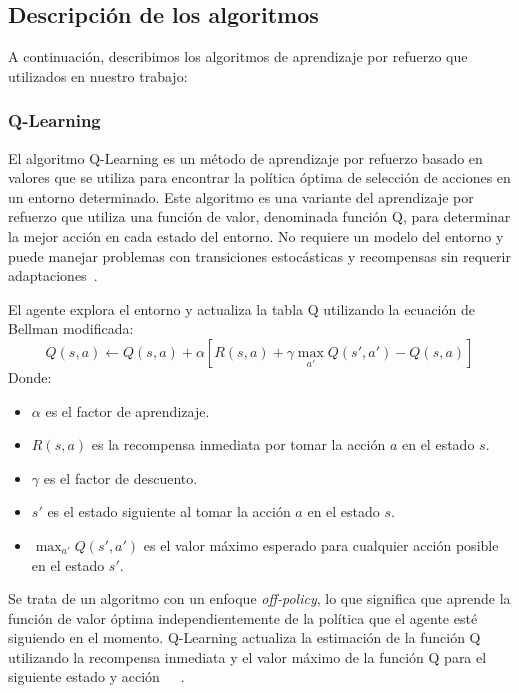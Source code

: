 \documentclass[conference,a4paper]{IEEEtran}
\begin{document}
\subsection{Descripción de los algoritmos}

A continuación, describimos los algoritmos de aprendizaje por refuerzo que utilizados en nuestro trabajo:\newline

\subsubsection{\textbf{Q-Learning}}
El algoritmo Q-Learning es un método de aprendizaje por refuerzo basado en valores que se utiliza para encontrar la política óptima de selección de acciones en un entorno determinado.
Este algoritmo es una variante del aprendizaje por refuerzo que utiliza una función de valor, denominada función Q, para determinar la mejor acción en cada estado del entorno.
No requiere un modelo del entorno y puede manejar problemas con transiciones estocásticas y recompensas sin requerir adaptaciones~\cite{b5}.

El agente explora el entorno y actualiza la tabla Q utilizando la ecuación de Bellman modificada:
\[
Q(s, a) \leftarrow Q(s, a) + \alpha [R(s, a) + \gamma \max_{a'} Q(s', a') - Q(s,a)]
\]
Donde:
\begin{itemize}
    \item \(\alpha\) es el factor de aprendizaje.
    \item \(R(s, a)\) es la recompensa inmediata por tomar la acción \(a\) en el estado \(s\).
    \item \(\gamma\) es el factor de descuento.
    \item \(s'\) es el estado siguiente al tomar la acción \(a\) en el estado \(s\).
    \item \(\max_{a'} Q(s', a')\) es el valor máximo esperado para cualquier acción posible en el estado \(s'\).\newline
\end{itemize}

Se trata de un algoritmo con un enfoque \textit{off-policy}, lo que significa que aprende la función de valor óptima independientemente de la política que el agente esté siguiendo en el momento. Q-Learning actualiza la estimación de la función Q utilizando la recompensa inmediata y el valor máximo de la función Q para el siguiente estado y acción~\cite{b1}~\cite{b4}~\cite{b5}.\newline
\end{document}

